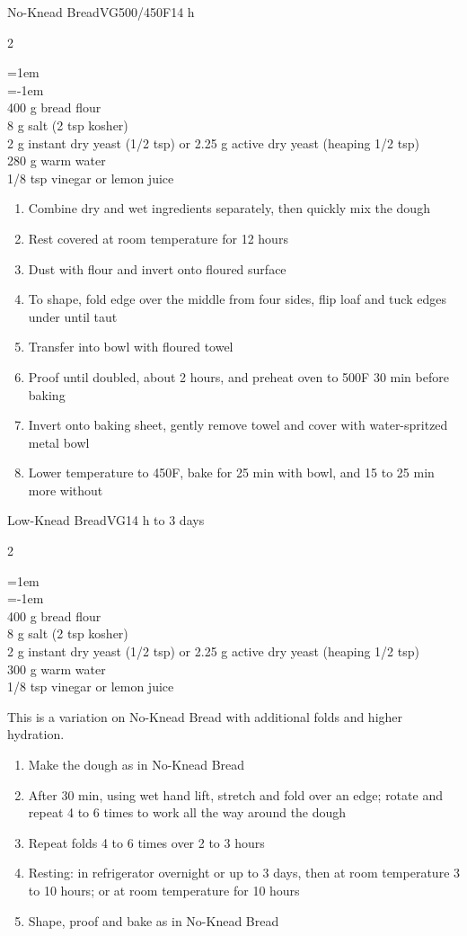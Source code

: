 \documentclass{article}
\newenvironment{recipe}[3][]
    {\begin{cardbase}[#1]{#2}{#3}
    \columnratio{0.333}
    \begin{paracol}{2}}
    {\end{paracol}\end{cardbase}}
\newenvironment{denserecipe}[3][]
    {\small
    \begin{recipe}[#1]{#2}{#3}}
    {\end{recipe}}
\newcommand{\nextcolumn}{\switchcolumn}
\newenvironment{ingredients}
    {
    \begin{obeylines}
    \vspace{\parskip}
    \setlength{\parskip}{0.25em}
    \vspace{-0.25em}
    \leftskip=1em
    \parindent=-1em}
    {\end{obeylines}}
\newenvironment{steps}
    {\begin{enumerate}[leftmargin=*,topsep=0pt]}
    {\end{enumerate}}
\newcommand{\fahrenheit}[1]{#1\textdegree{}F}
\newcommand{\tag}[1]{\hspace{1em}#1}
\newcommand{\symboltag}[2]{\tag{#1\hspace{0.4em}#2}}
\newcommand{\totaltime}[1]{\symboltag{\raisebox{-0.1em}{\small\StopWatchEnd}}{#1}}
\newcommand{\preheat}[1]{\symboltag{\Topbottomheat}{#1}}
\begin{document}
\begin{denserecipe}{No-Knead Bread}{\tag{VG}\preheat{\fahrenheit{500/450}}\totaltime{14 h}}
\begin{ingredients}
400 g bread flour
8 g salt (2 tsp kosher)
2 g instant dry yeast (1/2 tsp) or 2.25 g active dry yeast (heaping 1/2 tsp)
280 g warm water
1/8 tsp vinegar or lemon juice
\end{ingredients}
\nextcolumn
\begin{steps}
    \item Combine dry and wet ingredients separately, then quickly mix the dough
    \item Rest covered at room temperature for 12 hours
    \item Dust with flour and invert onto floured surface
    \item To shape, fold edge over the middle from four sides, flip loaf and tuck edges under until taut
    \item Transfer into bowl with floured towel
    \item Proof until doubled, about 2 hours, and preheat oven to \fahrenheit{500} 30 min before baking
    \item Invert onto baking sheet, gently remove towel and cover with water-spritzed metal bowl
    \item Lower temperature to \fahrenheit{450}, bake for 25 min with bowl, and 15 to 25 min more without
\end{steps}
\end{denserecipe}

\begin{denserecipe}{Low-Knead Bread}{\tag{VG}\totaltime{14 h to 3 days}}
\begin{ingredients}
400 g bread flour
8 g salt (2 tsp kosher)
2 g instant dry yeast (1/2 tsp) or 2.25 g active dry yeast (heaping 1/2 tsp)
300 g warm water
1/8 tsp vinegar or lemon juice
\end{ingredients}
\nextcolumn
This is a variation on No-Knead Bread with additional folds and higher hydration.
\begin{steps}
    \item Make the dough as in No-Knead Bread
    \item After 30 min, using wet hand lift, stretch and fold over an edge; rotate and repeat 4 to 6 times to work all the way around the dough
    \item Repeat folds 4 to 6 times over 2 to 3 hours
    \item Resting: in refrigerator overnight or up to 3 days, then at room temperature 3 to 10 hours; or at room temperature for 10 hours
    \item Shape, proof and bake as in No-Knead Bread
\end{steps}
\end{denserecipe}
\end{document}
